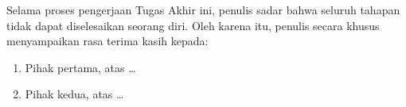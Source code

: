 Selama proses pengerjaan Tugas Akhir ini, penulis sadar bahwa seluruh tahapan tidak dapat diselesaikan seorang diri. Oleh karena itu, penulis secara khusus menyampaikan rasa terima kasih kepada:
\begin{enumerate}
  \item Pihak pertama, atas \dots
  \item Pihak kedua, atas \dots
\end{enumerate}
